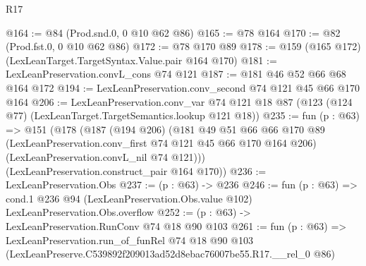 \begin{lexlean}{R17}
\begin{coremodule}
@164 := @84 (Prod.snd.{0, 0} @10 @62 @86)
@165 := @78 @164
@170 := @82 (Prod.fst.{0, 0} @10 @62 @86)
@172 := @78 @170 @89
@178 := @159 (@165 @172) (LexLeanTarget.TargetSyntax.Value.pair @164 @170)
@181 := LexLeanPreservation.convL_cons @74 @121
@187 := @181 @46 @52 @66 @68 @164 @172
@194 := LexLeanPreservation.conv_second @74 @121 @45 @66 @170 @164
@206 := LexLeanPreservation.conv_var
    @74
    @121
    @18
    @87
    (@123 (@124 @77) (LexLeanTarget.TargetSemantics.lookup @121 @18))
@235 := fun (p : @63) =>
  @151
    (@178
      (@187
        (@194 @206)
        (@181
          @49
          @51
          @66
          @66
          @170
          @89
          (LexLeanPreservation.conv_first @74 @121 @45 @66 @170 @164 @206)
          (LexLeanPreservation.convL_nil @74 @121)))
      (LexLeanPreservation.construct_pair @164 @170))
@236 := LexLeanPreservation.Obs
@237 := (p : @63) -> @236
@246 := fun (p : @63) =>
  cond.{1} @236 @94 (LexLeanPreservation.Obs.value @102) LexLeanPreservation.Obs.overflow
@252 := (p : @63) -> LexLeanPreservation.RunConv @74 @18 @90 @103
@261 := fun (p : @63) =>
  LexLeanPreservation.run_of_funRel
    @74
    @18
    @90
    @103
    (LexLeanPreserve.C539892f209013ad52d8ebac76007be55.R17.__rel_0 @86)
\end{coremodule}
\end{lexlean}
